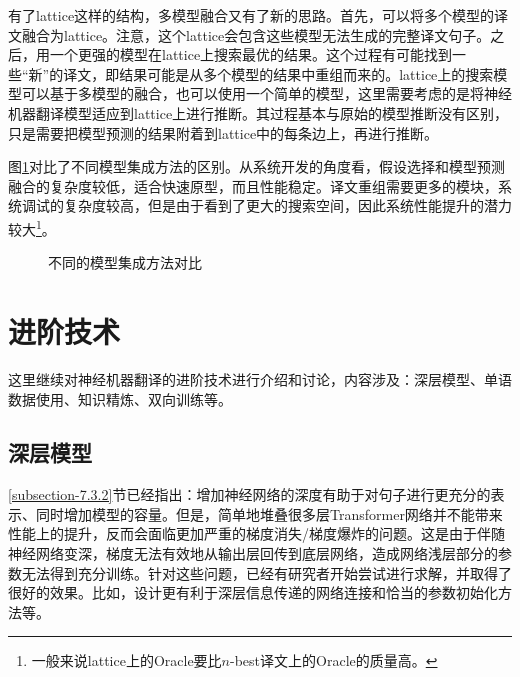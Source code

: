 \parinterval 有了lattice这样的结构，多模型融合又有了新的思路。首先，可以将多个模型的译文融合为lattice。注意，这个lattice会包含这些模型无法生成的完整译文句子。之后，用一个更强的模型在lattice上搜索最优的结果。这个过程有可能找到一些``新''的译文，即结果可能是从多个模型的结果中重组而来的。lattice上的搜索模型可以基于多模型的融合，也可以使用一个简单的模型，这里需要考虑的是将神经机器翻译模型适应到lattice上进行推断\cite{DBLP:conf/aaai/SuTXJSL17}。其过程基本与原始的模型推断没有区别，只是需要把模型预测的结果附着到lattice中的每条边上，再进行推断。

\parinterval 图\ref{fig:7-27}对比了不同模型集成方法的区别。从系统开发的角度看，假设选择和模型预测融合的复杂度较低，适合快速原型，而且性能稳定。译文重组需要更多的模块，系统调试的复杂度较高，但是由于看到了更大的搜索空间，因此系统性能提升的潜力较大\footnote{一般来说lattice上的Oracle要比$n$-best译文上的Oracle的质量高。}。

\begin{figure}[htp]
\centering

\caption{不同的模型集成方法对比}
\label{fig:7-27}
\end{figure}


\sectionnewpage
\section{进阶技术}

\parinterval 这里继续对神经机器翻译的进阶技术进行介绍和讨论，内容涉及：深层模型、单语数据使用、知识精炼、双向训练等。


\subsection{深层模型}
\label{subsection-7.5.1}

\parinterval \ref{subsection-7.3.2}节已经指出：增加神经网络的深度有助于对句子进行更充分的表示、同时增加模型的容量。但是，简单地堆叠很多层Transformer网络并不能带来性能上的提升，反而会面临更加严重的梯度消失/梯度爆炸的问题。这是由于伴随神经网络变深，梯度无法有效地从输出层回传到底层网络，造成网络浅层部分的参数无法得到充分训练\cite{WangLearning,DBLP:conf/cvpr/YuYR18}。针对这些问题，已经有研究者开始尝试进行求解，并取得了很好的效果。比如，设计更有利于深层信息传递的网络连接和恰当的参数初始化方法等\cite{DBLP:conf/emnlp/BapnaCFCW18,WangLearning,DBLP:conf/emnlp/ZhangTS19}。

